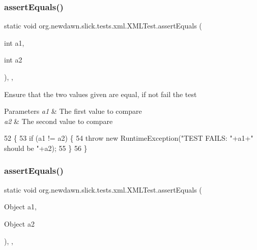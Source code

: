\subsubsection{\texorpdfstring{assert\+Equals()}{assertEquals()}\hspace{0.1cm}{\footnotesize\ttfamily [2/3]}}
{\footnotesize\ttfamily static void org.\+newdawn.\+slick.\+tests.\+xml.\+X\+M\+L\+Test.\+assert\+Equals (\begin{DoxyParamCaption}\item[{int}]{a1,  }\item[{int}]{a2 }\end{DoxyParamCaption})\hspace{0.3cm}{\ttfamily [inline]}, {\ttfamily [static]}, {\ttfamily [private]}}

Ensure that the two values given are equal, if not fail the test


\begin{DoxyParams}{Parameters}
{\em a1} & The first value to compare \\
\hline
{\em a2} & The second value to compare \\
\hline
\end{DoxyParams}

\begin{DoxyCode}
52                                                      \{
53         \textcolor{keywordflow}{if} (a1 != a2) \{
54             \textcolor{keywordflow}{throw} \textcolor{keyword}{new} RuntimeException(\textcolor{stringliteral}{"TEST FAILS: "}+a1+\textcolor{stringliteral}{" should be "}+a2);
55         \}
56     \}
\end{DoxyCode}
\mbox{\label{classorg_1_1newdawn_1_1slick_1_1tests_1_1xml_1_1_x_m_l_test_a80cef1ae18e5a1eea6e6b2eaaeed2bc5}} 
\subsubsection{\texorpdfstring{assert\+Equals()}{assertEquals()}\hspace{0.1cm}{\footnotesize\ttfamily [3/3]}}
{\footnotesize\ttfamily static void org.\+newdawn.\+slick.\+tests.\+xml.\+X\+M\+L\+Test.\+assert\+Equals (\begin{DoxyParamCaption}\item[{Object}]{a1,  }\item[{Object}]{a2 }\end{DoxyParamCaption})\hspace{0.3cm}{\ttfamily [inline]}, {\ttfamily [static]}, {\ttfamily [private]}}

